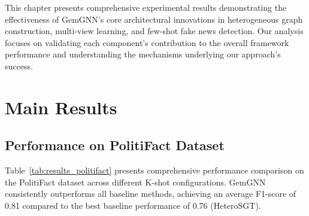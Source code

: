 
This chapter presents comprehensive experimental results demonstrating the effectiveness of GemGNN's core architectural innovations in heterogeneous graph construction, multi-view learning, and few-shot fake news detection. Our analysis focuses on validating each component's contribution to the overall framework performance and understanding the mechanisms underlying our approach's success.

\section{Main Results}

\subsection{Performance on PolitiFact Dataset}

Table~\ref{tab:results_politifact} presents comprehensive performance comparison on the PolitiFact dataset across different K-shot configurations. GemGNN consistently outperforms all baseline methods, achieving an average F1-score of 0.81 compared to the best baseline performance of 0.76 (HeteroSGT).

